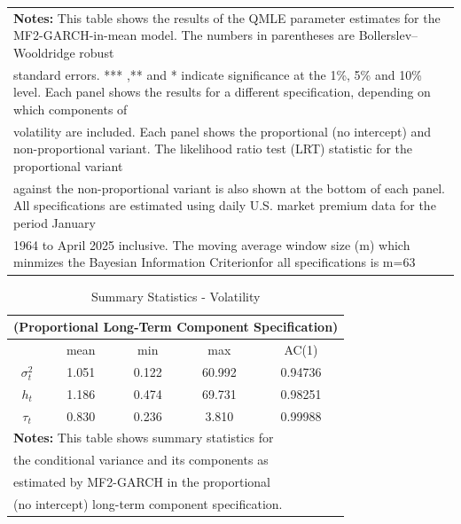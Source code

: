 \documentclass{article}
\begin{document}
\begin{table}
\begin{tabular}{ccccccccccccccccc}
\midrule
\multicolumn{17}{l}{\textbf{Notes:} This table shows the results of the QMLE parameter estimates for the MF2-GARCH-in-mean model. The numbers in parentheses are Bollerslev–Wooldridge robust}\\
\multicolumn{17}{l}{standard errors. *** ,** and * indicate significance at the 1\%, 5\% and 10\% level. Each panel shows the results for a different specification, depending on which components of}\\
\multicolumn{17}{l}{volatility are included. Each panel shows the proportional (no intercept) and non-proportional variant. The likelihood ratio test (LRT) statistic for the proportional variant}\\
\multicolumn{17}{l}{against the non-proportional variant is also shown at the bottom of each panel. All specifications are estimated using daily U.S. market premium data for the period January}\\
\multicolumn{17}{l}{1964 to April 2025 inclusive. The moving average window size (m) which minmizes the Bayesian Information Criterionfor all specifications is m=63}\\
\midrule
\midrule
\end{tabular}
\end{table}
\restoregeometry

\pagebreak
\setcounter{table}{4}
\begin{table}
\centering
\caption{Summary Statistics - Volatility}
\begin{tabular}{ccccc}
\multicolumn{5}{c}{(Proportional Long-Term Component Specification)}\\
\midrule
\midrule
\mbox{} & mean & min & max & AC(1)\\
\midrule
\mbox{$\sigma^2_t$}& 1.051 & 0.122 & 60.992 & 0.94736\\
\mbox{$h_t$} & 1.186 & 0.474 & 69.731 & 0.98251\\
\mbox{$\tau_t$} & 0.830 & 0.236 & 3.810 & 0.99988\\
\midrule
\multicolumn{5}{l}{\textbf{Notes:} This table shows summary statistics for}\\
\multicolumn{5}{l}{the conditional variance and its components as}\\
\multicolumn{5}{l}{estimated by MF2-GARCH in the proportional}\\
\multicolumn{5}{l}{(no intercept) long-term component specification.}\\
\midrule
\midrule
\end{tabular}
\end{table}
\end{document}

